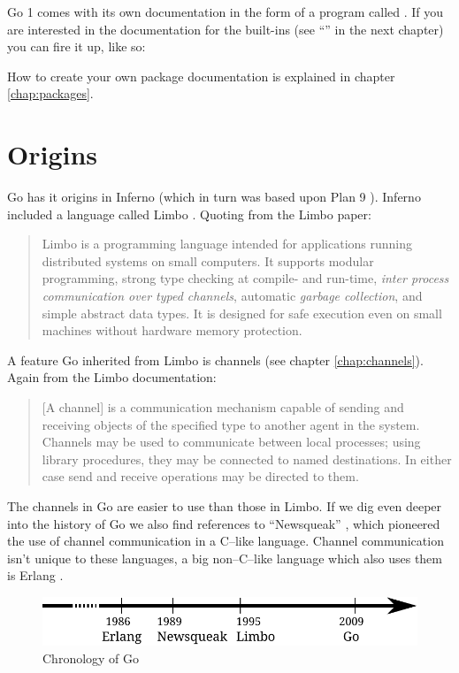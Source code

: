 Go 1 comes with its own documentation in the form of a program called 
. If you are interested in the documentation
for the built-ins (see ``'' in the next chapter) you
can fire it up, like so:
\begin{display}
\pr {}
\end{display}

How to create your own package documentation is explained in chapter \ref{chap:packages}.

\section{Origins}
Go has it origins in Inferno \cite{inferno} (which in turn was based
upon Plan 9 \cite{plan9}). Inferno included a language called Limbo
\cite{limbo}. Quoting from the Limbo paper:
\begin{quote}
Limbo is a programming language intended for applications running
distributed systems on small computers. It supports modular programming,
strong type checking at compile- and run-time, \emph{inter process
communication over typed channels}, automatic \emph{garbage collection}, and
simple abstract data types. It is designed for safe execution even on
small machines without hardware memory protection.
\end{quote}
A feature Go inherited from Limbo is channels (see chapter
\ref{chap:channels}). Again from the Limbo documentation:
\begin{quote}
[A channel] is a communication mechanism capable of sending and receiving objects of
the specified type to another agent in the system. Channels may be used
to communicate between local processes; using library procedures, they
may be connected to named destinations. In either case send and receive
operations may be directed to them.
\end{quote}
The channels in Go are easier to use than those in Limbo.
If we dig even deeper into the history of Go we also find references
to ``Newsqueak'' \cite{newsqueak}, which pioneered the use of 
channel communication in a C--like language. Channel
communication isn't unique to these languages, a big non--C--like
language which also uses them is Erlang \cite{erlang}.

\begin{figure}[H]
\caption{Chronology of Go}
\label{fig:chrono-of-go}
\begin{center}
\includegraphics[scale=0.65]{fig/go-history.pdf}
\end{center}
\end{figure}

